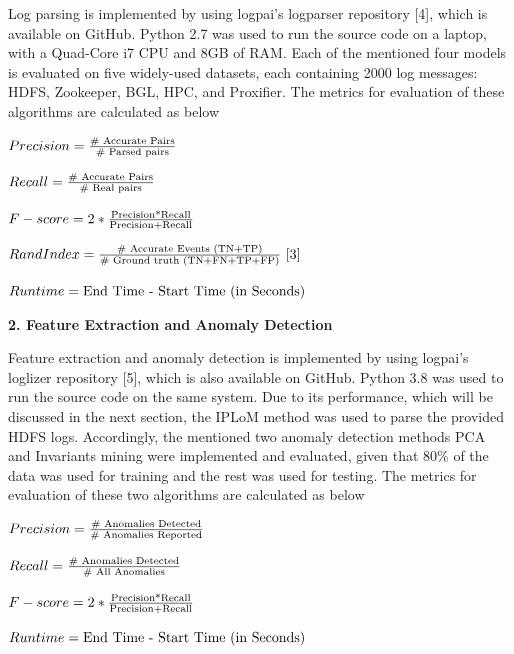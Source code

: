\documentclass[12pt,a4paper]{article}
\begin{document}
	\noindent Log parsing is implemented by using logpai's logparser repository [4], which is available on GitHub. Python 2.7 was used to run the source code on a laptop, with a Quad-Core i7 CPU and 8GB of RAM. Each of the mentioned four models is evaluated on five widely-used datasets, each containing 2000 log messages: HDFS, Zookeeper, BGL, HPC, and Proxifier. The metrics for evaluation of these algorithms are calculated as below
	\begin{center}
		$Precision = \frac{\textmd{\# Accurate Pairs}}{\textmd{\# Parsed pairs}}$\\\vspace{0.2cm}
		
		$Recall = \frac{\textmd{\# Accurate Pairs}}{\textmd{\# Real pairs}}$\\\vspace{0.2cm}
		
		$F-score = 2*\frac{\textmd{Precision*Recall}}{\textmd{Precision+Recall}}$\\\vspace{0.2cm}
		
		$RandIndex = \frac{\textmd{\# Accurate Events (TN+TP)}}{\textmd{\# Ground truth (TN+FN+TP+FP)}} \textmd{ [3]}$\\\vspace{0.2cm}
		
		$Runtime = \textmd{End Time - Start Time (in Seconds)}$
	\end{center}
	
	
	\vspace{0.4cm}
	\noindent \textbf{\large 2. Feature Extraction and Anomaly Detection}
	\vspace{0.3cm}
	
	\noindent Feature extraction and anomaly detection is implemented by using logpai's loglizer repository [5], which is also available on GitHub. Python 3.8 was used to run the source code on the same system. Due to its performance, which will be discussed in the next section, the IPLoM method was used to parse the provided HDFS logs. Accordingly, the mentioned two anomaly detection methods PCA and Invariants mining were implemented and evaluated, given that 80\% of the data was used for training and the rest was used for testing. The metrics for evaluation of these two algorithms are calculated as below
	\begin{center}
		$Precision = \frac{\textmd{\# Anomalies Detected}}{\textmd{\# Anomalies Reported}}$\\\vspace{0.2cm}
		
		$Recall = \frac{\textmd{\# Anomalies Detected}}{\textmd{\# All Anomalies}}$\\\vspace{0.2cm}
		
		$F-score = 2*\frac{\textmd{Precision*Recall}}{\textmd{Precision+Recall}}$\\\vspace{0.2cm}
		
		$Runtime = \textmd{End Time - Start Time (in Seconds)}$
	\end{center}
\end{document}

